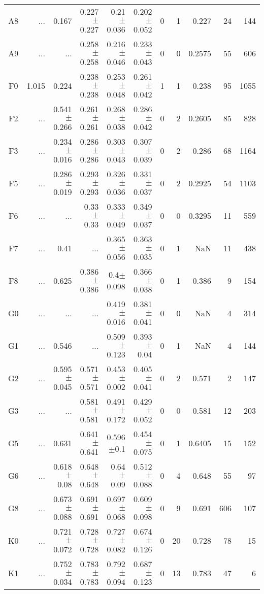 \begin{table}[t]
\begin{table}[t]
\begin{center}
\begin{tabular}{c|rrrrr|rrrrr}
    A8	&	 ...	&	0.167	&	0.227$\pm$0.227	&	0.21$\pm$0.036	&	0.202$\pm$0.052	&	0	&	1	&	0.227	&	24	&	144	\\
    A9	&	 ...	&	 ...	&	0.258$\pm$0.258	&	0.216$\pm$0.046	&	0.233$\pm$0.043	&	0	&	0	&	0.2575	&	55	&	606	\\
    F0	&	1.015	&	0.224	&	0.238$\pm$0.238	&	0.253$\pm$0.048	&	0.261$\pm$0.042	&	1	&	1	&	0.238	&	95	&	1055	\\
    F2	&	 ...	&	0.541$\pm$0.266	&	0.261$\pm$0.261	&	0.268$\pm$0.038	&	0.286$\pm$0.042	&	0	&	2	&	0.2605	&	85	&	828	\\
    F3	&	 ...	&	0.234$\pm$0.016	&	0.286$\pm$0.286	&	0.303$\pm$0.043	&	0.307$\pm$0.039	&	0	&	2	&	0.286	&	68	&	1164	\\
    F5	&	 ...	&	0.286$\pm$0.019	&	0.293$\pm$0.293	&	0.326$\pm$0.036	&	0.331$\pm$0.037	&	0	&	2	&	0.2925	&	54	&	1103	\\
    F6	&	 ...	&	 ...	&	0.33$\pm$0.33	&	0.333$\pm$0.049	&	0.349$\pm$0.037	&	0	&	0	&	0.3295	&	11	&	559	\\
    F7	&	 ...	&	0.41	&	 ...	&	0.365$\pm$0.056	&	0.363$\pm$0.035	&	0	&	1	&	NaN	&	11	&	438	\\
    F8	&	 ...	&	0.625	&	0.386$\pm$0.386	&	0.4$\pm$0.098	&	0.366$\pm$0.038	&	0	&	1	&	0.386	&	9	&	154	\\
    G0	&	 ...	&	 ...	&	 ...	&	0.419$\pm$0.016	&	0.381$\pm$0.041	&	0	&	0	&	NaN	&	4	&	314	\\
    G1	&	 ...	&	0.546	&	 ...	&	0.509$\pm$0.123	&	0.393$\pm$0.04	&	0	&	1	&	NaN	&	4	&	144	\\
    G2	&	 ...	&	0.595$\pm$0.045	&	0.571$\pm$0.571	&	0.453$\pm$0.002	&	0.405$\pm$0.041	&	0	&	2	&	0.571	&	2	&	147	\\
    G3	&	 ...	&	 ...	&	0.581$\pm$0.581	&	0.491$\pm$0.172	&	0.429$\pm$0.052	&	0	&	0	&	0.581	&	12	&	203	\\
    G5	&	 ...	&	0.631	&	0.641$\pm$0.641	&	0.596$\pm$0.1	&	0.454$\pm$0.075	&	0	&	1	&	0.6405	&	15	&	152	\\
    G6	&	 ...	&	0.618$\pm$0.08	&	0.648$\pm$0.648	&	0.64$\pm$0.09	&	0.512$\pm$0.088	&	0	&	4	&	0.648	&	55	&	97	\\
    G8	&	 ...	&	0.673$\pm$0.088	&	0.691$\pm$0.691	&	0.697$\pm$0.068	&	0.609$\pm$0.098	&	0	&	9	&	0.691	&	606	&	107	\\
    K0	&	 ...	&	0.721$\pm$0.072	&	0.728$\pm$0.728	&	0.727$\pm$0.082	&	0.674$\pm$0.126	&	0	&	20	&	0.728	&	78	&	15	\\
    K1	&	 ...	&	0.752$\pm$0.034	&	0.783$\pm$0.783	&	0.792$\pm$0.094	&	0.687$\pm$0.123	&	0	&	13	&	0.783	&	47	&	6	\\

\end{tabular}
\end{center}
\end{table}
\end{table}
